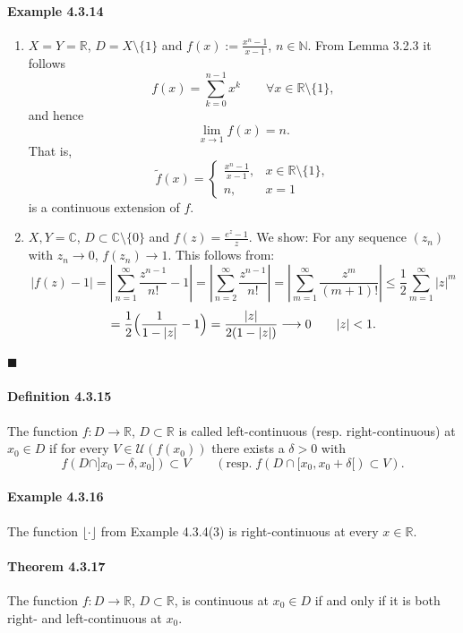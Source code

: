\documentclass[12pt]{article}
\begin{document}
\paragraph{Example 4.3.14}
\begin{enumerate}[label=({\arabic*})]
	\item $X = Y = \mathbb R$, $D = X\setminus \{1\}$ and $f(x) := \frac{x^n - 1}{x - 1}$, $n \in \mathbb N$. From Lemma 3.2.3 it follows
	\[
		f(x) = \sum_{k=0}^{n-1} x^k \qquad \forall x \in \mathbb R \setminus \{1\},
	\]
	and hence
	\[
		\lim_{x\to 1} f(x) = n.
	\]
	That is,
	\[
		\tilde f(x) = \begin{cases}
		\frac{x^n - 1}{x - 1}, & x \in \mathbb R \setminus \{1\}, \\
		n, & x = 1
		\end{cases}
	\]
	is a continuous extension of $f$.
	\item $X,Y = \mathbb C$, $D \subset \mathbb C \setminus \{0\}$ and $f(z) = \frac{e^z - 1}{z}$. We show: For any sequence $(z_n)$ with $z_n \to 0$, $f(z_n) \to 1$. This follows from:
	\[
		|f(z) - 1| = \left|\sum_{n=1}^{\infty} \frac{z^{n-1}}{n!} - 1\right| = \left|\sum_{n=2}^{\infty} \frac{z^{n-1}}{n!}\right| = \left|\sum_{m=1}^{\infty} \frac{z^{m}}{(m+1)!}\right| \le \frac{1}{2} \sum_{m=1}^{\infty} |z|^{m}
	\]
	\[
		= \frac{1}{2} \Bigl( \frac{1}{1 - |z|} - 1\Bigr) = \frac{|z|}{2(1 - |z|)} \longrightarrow 0 \qquad |z| < 1.
	\]
\end{enumerate}
\hfill $\blacksquare$

\paragraph{Definition 4.3.15} The function $f : D \to \mathbb R$, $D \subset \mathbb R$ is called left-continuous (resp. right-continuous) at $x_0 \in D$ if for every $V \in \mathcal U(f(x_0))$ there exists a $\delta > 0$ with
\[
	f(D \cap ]x_0 - \delta, x_0]) \subset V \qquad (\text{resp.}\; f(D \cap [x_0, x_0 + \delta[) \subset V ).
\]

\paragraph{Example 4.3.16} The function $\lfloor\cdot\rfloor$ from Example 4.3.4(3) is right-continuous at every $x \in \mathbb R$.

\paragraph{Theorem 4.3.17} The function $f : D \to \mathbb R$, $D \subset \mathbb R$, is continuous at $x_0 \in D$ if and only if it is both right- and left-continuous at $x_0$.
\end{document}
